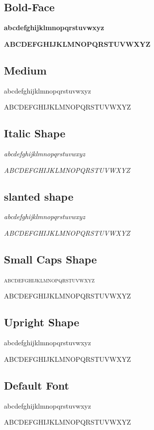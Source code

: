 \documentclass[a4paper, 12pt, oneside]{book}
\begin{document}
\subsection{Bold-Face}
\textbf{abcdefghijklmnopqrstuvwxyz}

\textbf{ABCDEFGHIJKLMNOPQRSTUVWXYZ}

\subsection{Medium}
\textmd{abcdefghijklmnopqrstuvwxyz}

\textmd{ABCDEFGHIJKLMNOPQRSTUVWXYZ}

\subsection{Italic Shape}
\textit{abcdefghijklmnopqrstuvwxyz}

\textit{ABCDEFGHIJKLMNOPQRSTUVWXYZ}

\subsection{slanted shape}
\textsl{abcdefghijklmnopqrstuvwxyz}

\textsl{ABCDEFGHIJKLMNOPQRSTUVWXYZ}

\subsection{Small Caps Shape}
\textsc{abcdefghijklmnopqrstuvwxyz}

\textsc{ABCDEFGHIJKLMNOPQRSTUVWXYZ}

\subsection{Upright Shape}
\textup{abcdefghijklmnopqrstuvwxyz}

\textup{ABCDEFGHIJKLMNOPQRSTUVWXYZ}

\subsection{Default Font}
\textnormal{abcdefghijklmnopqrstuvwxyz}

\textnormal{ABCDEFGHIJKLMNOPQRSTUVWXYZ}
\end{document}
